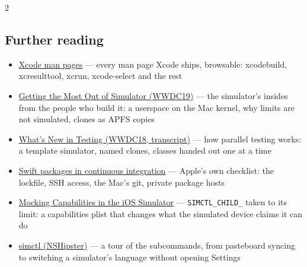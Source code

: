 \documentclass[8pt]{extarticle}
\begin{document}
\begin{multicols}{2}
\begin{htmlonly}
\section{Further reading}
\begin{itemize}
  \item \href{https://keith.github.io/xcode-man-pages/}{Xcode man pages} — every man page Xcode ships, browsable: xcodebuild, xcresulttool, xcrun, xcode-select and the rest
  \item \href{https://developer.apple.com/videos/play/wwdc2019/418/}{Getting the Most Out of Simulator (WWDC19)} — the simulator's insides from the people who build it: a userspace on the Mac kernel, why limits are not simulated, clones as APFS copies
  \item \href{https://asciiwwdc.com/2018/sessions/403}{What's New in Testing (WWDC18, transcript)} — how parallel testing works: a template simulator, named clones, classes handed out one at a time
  \item \href{https://developer.apple.com/documentation/xcode/building-swift-packages-or-apps-that-use-them-in-continuous-integration-workflows}{Swift packages in continuous integration} — Apple's own checklist: the lockfile, SSH access, the Mac's git, private package hosts
  \item \href{https://saagarjha.com/blog/2019/01/11/mocking-capabilities-in-the-ios-simulator/}{Mocking Capabilities in the iOS Simulator} — \texttt{SIMCTL\_CHILD\_} taken to its limit: a capabilities plist that changes what the simulated device claims it can do
  \item \href{https://nshipster.com/simctl/}{simctl (NSHipster)} — a tour of the subcommands, from pasteboard syncing to switching a simulator's language without opening Settings
\end{itemize}
\end{htmlonly}

\end{multicols}

\end{document}
